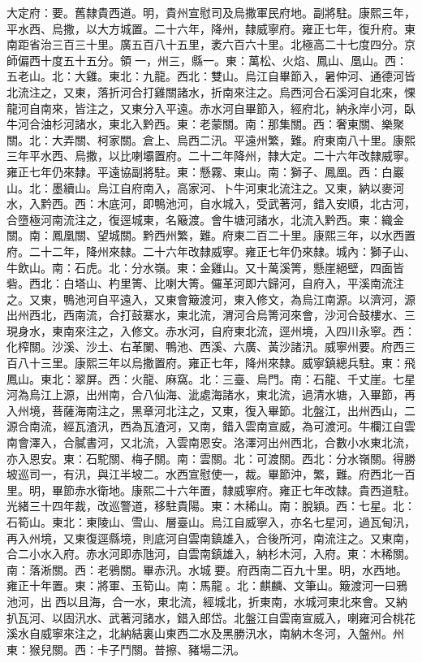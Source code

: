 \begin{pinyinscope}
大定府：要。舊隸貴西道。明，貴州宣慰司及烏撒軍民府地。副將駐。康熙三年，平水西、烏撒，以大方城置。二十六年，降州，隸威寧府。雍正七年，復升府。東南距省治三百三十里。廣五百八十五里，袤六百六十里。北極高二十七度四分。京師偏西十度五十五分。領一，州三，縣一。東：萬松、火焰、鳳山、凰山。西：五老山。北：大雞。東北：九龍。西北：雙山。烏江自畢節入，暑仲河、通德河皆北流注之，又東，落折河合打雞關諸水，折南來注之。烏西河合石溪河自北來，惈龍河自南來，皆注之，又東分入平遠。赤水河自畢節入，經府北，納永岸小河，臥牛河合油杉河諸水，東北入黔西。東：老蒙關。南：那集關。西：奢東關、樂聚關。北：大弄關、柯家關。倉上、烏西二汛。平遠州繁，難。府東南八十里。康熙三年平水西、烏撒，以比喇壩置府。二十二年降州，隸大定。二十六年改隸威寧。雍正七年仍來隸。平遠協副將駐。東：懸霧、東山。南：獅子、鳳凰。西：白巖山。北：墨續山。烏江自府南入，高家河、卜牛河東北流注之。又東，納以麥河水，入黔西。西：木底河，即鴨池河，自水城入，受武著河，錯入安順，北古河，合墮極河南流注之，復逕城東，名簸渡。會牛塘河諸水，北流入黔西。東：織金關。南：鳳凰關、望城關。黔西州繁，難。府東二百二十里。康熙三年，以水西置府。二十二年，降州來隸。二十六年改隸威寧。雍正七年仍來隸。城內：獅子山、牛飲山。南：石虎。北：分水嶺。東：金雞山。又十萬溪箐，懸崖絕壁，四面皆砦。西北：白塔山、杓里箐、比喇大箐。儸革河即六歸河，自府入，平溪南流注之。又東，鴨池河自平遠入，又東會簸渡河，東入修文，為烏江南源。以濟河，源出州西北，西南流，合打鼓寨水，東北流，渭河合烏箐河來會，沙河合鼓樓水、三現身水，東南來注之，入修文。赤水河，自府東北流，逕州境，入四川永寧。西：化榨關。沙溪、沙土、右革闌、鴨池、西溪、六廣、黃沙諸汛。威寧州要。府西三百八十三里。康熙三年以烏撒置府。雍正七年，降州來隸。威寧鎮總兵駐。東：飛鳳山。東北：翠屏。西：火龍、麻窩。北：三臺、烏門。南：石龍、千丈崖。七星河為烏江上源，出州南，合八仙海、泚處海諸水，東北流，過清水塘，入畢節，再入州境，菩薩海南注之，黑章河北注之，又東，復入畢節。北盤江，出州西山，二源合南流，經瓦渣汛，西為瓦渣河，又南，錯入雲南宣威，為可渡河。牛欄江自雲南會澤入，合膩書河，又北流，入雲南恩安。洛澤河出州西北，合數小水東北流，亦入恩安。東：石駝關、梅子關。南：雲關。北：可渡關。西北：分水嶺關。得勝坡巡司一，有汛，與江半坡二。水西宣慰使一，裁。畢節沖，繁，難。府西北一百里。明，畢節赤水衛地。康熙二十六年置，隸威寧府。雍正七年改隸。貴西道駐。光緒三十四年裁，改巡警道，移駐貴陽。東：木稀山。南：脫穎。西：七星。北：石筍山。東北：東陵山、雪山、層臺山。烏江自威寧入，亦名七星河，過瓦甸汛，再入州境，又東復逕縣境，則底河自雲南鎮雄入，合後所河，南流注之。又東南，合二小水入府。赤水河即赤虺河，自雲南鎮雄入，納杉木河，入府。東：木稀關。南：落淅關。西：老鴉關。畢赤汛。水城要。府西南二百九十里。明，水西地。雍正十年置。東：將軍、玉筍山。南：馬龍。北：麒麟、文筆山。簸渡河一曰鴉池河，出西以且海，合一水，東北流，經城北，折東南，水城河東北來會。又納扒瓦河、以固汛水、武著河諸水，錯入郎岱。北盤江自雲南宣威入，喇雍河合桃花溪水自威寧來注之，北納結裏山東西二水及黑勝汛水，南納木冬河，入盤州。州東：猴兒關。西：卡子鬥關。普擦、豬場二汛。


\end{pinyinscope}
